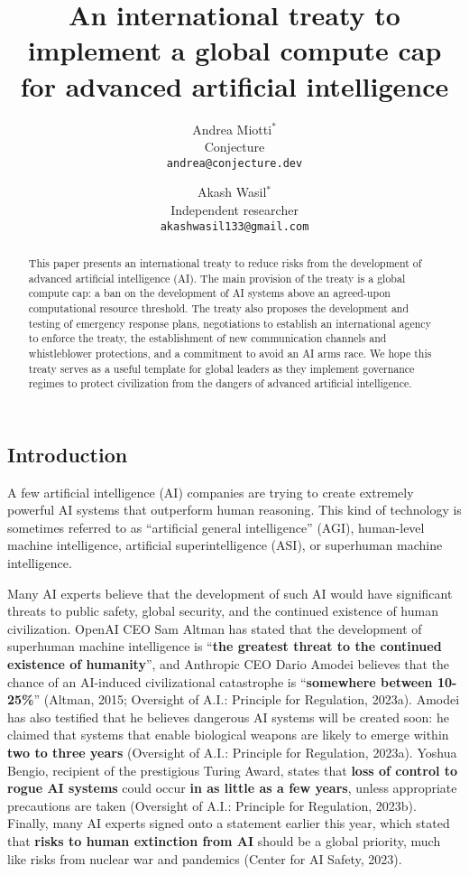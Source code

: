 \documentclass[12pt,a4paper]{article}
\title{An international treaty to implement a global compute cap for advanced artificial intelligence}
\author{
  Andrea Miotti$^*$\\
  \small{Conjecture}\\
  \small\texttt{andrea@conjecture.dev}
  \and 
  Akash Wasil$^*$\\
  \small{Independent researcher}\\
  \small\texttt{akashwasil133@gmail.com}
}
\date{}
\begin{document}
\maketitle

\begin{abstract}
\noindent
This paper presents an international treaty to reduce risks from the development of advanced artificial intelligence (AI). The main provision of the treaty is a global compute cap: a ban on the development of AI systems above an agreed-upon computational resource threshold. The treaty also proposes the development and testing of emergency response plans, negotiations to establish an international agency to enforce the treaty, the establishment of new communication channels and whistleblower protections, and a commitment to avoid an AI arms race. We hope this treaty serves as a useful template for global leaders as they implement governance regimes to protect civilization from the dangers of advanced artificial intelligence. 

\end{abstract}

\newpage
\tableofcontents

\subsection*{Introduction}

A few artificial intelligence (AI) companies are trying to create extremely powerful AI systems that outperform human reasoning. This kind of technology is sometimes referred to as “artificial general intelligence” (AGI), human-level machine intelligence, artificial superintelligence (ASI), or superhuman machine intelligence.

Many AI experts believe that the development of such AI would have significant threats to public safety, global security, and the continued existence of human civilization. OpenAI CEO Sam Altman has stated that the development of superhuman machine intelligence is “\textbf{the greatest threat to the continued existence of humanity}”, and Anthropic CEO Dario Amodei believes that the chance of an AI-induced civilizational catastrophe is “\textbf{somewhere between 10-25\%}” (Altman, 2015; Oversight of A.I.: Principle for Regulation, 2023a). Amodei has also testified that he believes dangerous AI systems will be created soon: he claimed that systems that enable biological weapons are likely to emerge within \textbf{two to three years} (Oversight of A.I.: Principle for Regulation, 2023a). Yoshua Bengio, recipient of the prestigious Turing Award, states that \textbf{loss of control to rogue AI systems} could occur \textbf{in as little as a few years}, unless appropriate precautions are taken (Oversight of A.I.: Principle for Regulation, 2023b). Finally, many AI experts signed onto a statement earlier this year, which stated that \textbf{risks to human extinction from AI} should be a global priority, much like risks from nuclear war and pandemics (Center for AI Safety, 2023).
\end{document}
